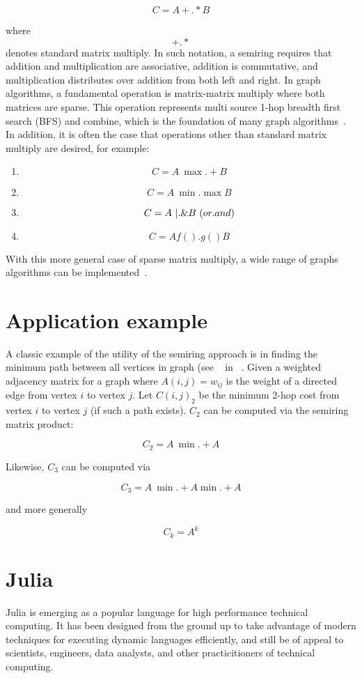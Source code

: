 \documentclass[conference]{IEEEtran}
\begin{document}
$$C = A +.* B$$

where $$+.*$$ denotes standard matrix multiply.  In such notation, a
semiring requires that addition and multiplication are associative,
addition is commutative, and multiplication distributes over addition
from both left and right.  In graph algorithms, a fundamental
operation is matrix-matrix multiply where both matrices are sparse.
This operation represents multi source 1-hop breadth first search
(BFS) and combine, which is the foundation of many graph
algorithms~\cite{shahgilbert}.  In addition, it is often the case that
operations other than standard matrix multiply are desired, for
example:

\begin{enumerate}
\item $$C = A \ {\max.+} B$$
\item $$C = A \ \min.\max B$$
\item $$C = A \ |.\& B \ ({\mbox or.and})$$
\item $$C = A f().g() B $$
\end{enumerate}

With this more general case of sparse matrix multiply, a wide range of graphs algorithms can be implemented~\cite{KepnerGilbertBook}.

\section{Application example}

A classic example of the utility of the semiring approach is in
finding the minimum path between all vertices in graph (see
~\cite{Rader} in ~\cite{KepnerGilbertBook}.  Given a weighted
adjacency matrix for a graph where $A(i,j) = w_{ij}$ is the weight of
a directed edge from vertex $i$ to vertex $j$.  Let $C(i,j)_2$ be the
minimum 2-hop cost from vertex $i$ to vertex $j$ (if such a path
exists).  $C_2$ can be computed via the semiring matrix product:

$$C_2 = A \ \min.+ A$$

Likewise, $C_3$ can be computed via

$$C_3 = A\  \min.+ A \min.+ A$$

and more generally

$$C_k = A^k$$

\section{Julia}

Julia is emerging as a popular language for high performance
technical computing.  It has been designed from the ground up to take advantage
of modern techniques for executing dynamic languages efficiently, and still
be of appeal to scientists, engineers, data analysts, and other
practicitioners of technical computing\cite{julia}.
\end{document}
